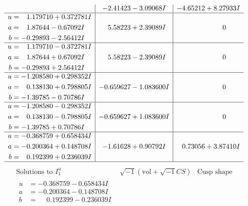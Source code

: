 \documentclass[1p]{elsarticle_modified}
\theoremstyle{definition}
\newcommand{\I}{\sqrt{-1}}
\begin{document}
$$\begin{array}{c|c|c}
 & -2.41423 - 3.09068 I & -4.65212 + 8.27933 I \\ \hline\begin{aligned}
u &= \phantom{-}1.179710 + 0.372781 I \\
a &= \phantom{-}1.87644 - 0.67092 I \\
b &= -0.29893 - 2.56412 I\end{aligned}
 & \phantom{-}5.58223 + 2.39089 I & \phantom{-0.000000 } 0 \\ \hline\begin{aligned}
u &= \phantom{-}1.179710 - 0.372781 I \\
a &= \phantom{-}1.87644 + 0.67092 I \\
b &= -0.29893 + 2.56412 I\end{aligned}
 & \phantom{-}5.58223 - 2.39089 I & \phantom{-0.000000 } 0 \\ \hline\begin{aligned}
u &= -1.208580 + 0.298352 I \\
a &= \phantom{-}0.138130 + 0.798805 I \\
b &= -1.39785 - 0.70786 I\end{aligned}
 & -0.659627 - 1.083600 I & \phantom{-0.000000 } 0 \\ \hline\begin{aligned}
u &= -1.208580 - 0.298352 I \\
a &= \phantom{-}0.138130 - 0.798805 I \\
b &= -1.39785 + 0.70786 I\end{aligned}
 & -0.659627 + 1.083600 I & \phantom{-0.000000 } 0 \\ \hline\begin{aligned}
u &= -0.368759 + 0.658434 I \\
a &= -0.200364 + 0.148708 I \\
b &= \phantom{-}0.192399 + 0.236039 I\end{aligned}
 & -1.61628 + 0.90792 I & \phantom{-}0.73056 + 3.87410 I\\
 \hline 
 \end{array}$$\newpage$$\begin{array}{c|c|c}  
\text{Solutions to }I^u_{1}& \I (\text{vol} + \sqrt{-1}CS) & \text{Cusp shape}\\
 \hline 
\begin{aligned}
u &= -0.368759 - 0.658434 I \\
a &= -0.200364 - 0.148708 I \\
b &= \phantom{-}0.192399 - 0.236039 I\end{aligned}

\end{array}$$
\end{document}
